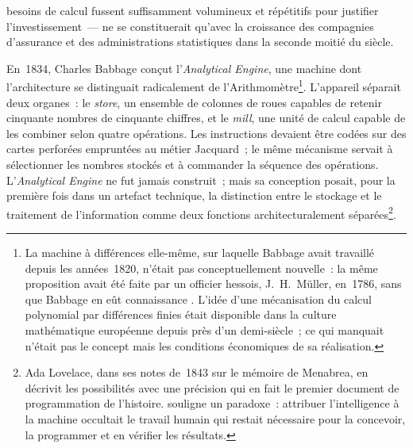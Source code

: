 besoins de calcul fussent suffisamment volumineux et répétitifs pour justifier l'investissement~--- ne se constituerait qu'avec la croissance des compagnies d'assurance et des administrations statistiques dans la seconde moitié du siècle.

En~1834, Charles Babbage conçut l'\emph{Analytical Engine}, une machine dont l'architecture se distinguait radicalement de l'Arithmomètre\footnote{La machine à différences elle-même, sur laquelle Babbage avait travaillé depuis les années~1820, n'était pas conceptuellement nouvelle~: la même proposition avait été faite par un officier hessois, J.~H.~Müller, en~1786, sans que Babbage en eût connaissance \parencite[p.~42]{augarten_bit_1984}. L'idée d'une mécanisation du calcul polynomial par différences finies était disponible dans la culture mathématique européenne depuis près d'un demi-siècle~; ce qui manquait n'était pas le concept mais les conditions économiques de sa réalisation.}. L'appareil séparait deux organes~: le \emph{store}, un ensemble de colonnes de roues capables de retenir cinquante nombres de cinquante chiffres, et le \emph{mill}, une unité de calcul capable de les combiner selon quatre opérations. Les instructions devaient être codées sur des cartes perforées empruntées au métier Jacquard~; le même mécanisme servait à sélectionner les nombres stockés et à commander la séquence des opérations. L'\emph{Analytical Engine} ne fut jamais construit~; mais sa conception posait, pour la première fois dans un artefact technique, la distinction entre le stockage et le traitement de l'information comme deux fonctions architecturalement séparées\footnote{Ada Lovelace, dans ses notes de~1843 sur le mémoire de Menabrea, en décrivit les possibilités avec une précision qui en fait le premier document de programmation de l'histoire. \textcite{schaffer_babbage_1994} souligne un paradoxe~: attribuer l'intelligence à la machine occultait le travail humain qui restait nécessaire pour la concevoir, la programmer et en vérifier les résultats.}.

